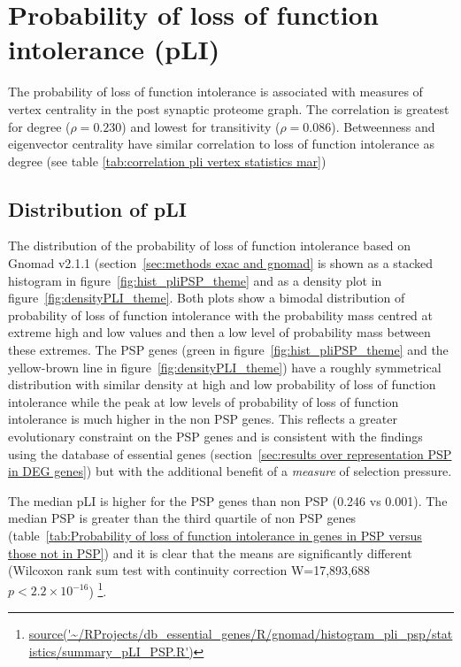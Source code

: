\section{Probability of loss of function intolerance (pLI)}
\label{sec: results pLI}


The probability of loss of function intolerance is associated with measures of vertex centrality in the post synaptic proteome graph. The correlation is greatest for degree ($\rho=0.230$) and lowest for transitivity ($\rho=0.086$). Betweenness and eigenvector centrality have similar correlation to loss of function intolerance as degree (see table \ref{tab:correlation pli vertex statistics mar})

\subsection{Distribution of pLI}
\label{sec:results distribution of pli}
The distribution of the probability of loss of function intolerance based on Gnomad v2.1.1 (section~\ref{sec:methods exac and gnomad} is shown as a stacked histogram in  figure~\ref{fig:hist_pliPSP_theme} and as a density plot in figure~\ref{fig:densityPLI_theme}. Both plots show a bimodal distribution of probability of loss of function intolerance with the probability mass centred at extreme high and low values and then a low level of probability mass between these extremes. The PSP genes (green in figure~\ref{fig:hist_pliPSP_theme} and the yellow-brown line in figure~\ref{fig:densityPLI_theme}) have a roughly symmetrical distribution with similar density at high and low probability of loss of function intolerance while the peak at low levels of probability of loss of function intolerance is much higher in the non PSP genes. This reflects a greater evolutionary constraint on the PSP genes and is consistent with the findings using the database of essential genes (section~\ref{sec:results over representation PSP in DEG genes}) but with the additional benefit of a \textit{measure} of selection pressure. 


The median pLI is higher for the PSP genes than non PSP (0.246 vs 0.001). The median PSP is greater than the third quartile of non PSP genes (table~\ref{tab:Probability of loss of function intolerance in genes in PSP versus those not in PSP}) and it is clear that the means are significantly different (Wilcoxon rank sum test with continuity correction W=17,893,688 $p<2.2\times10^{-16}$) \footnote{\url{source('~/RProjects/db_essential_genes/R/gnomad/histogram_pli_psp/statistics/summary_pLI_PSP.R')}}.


